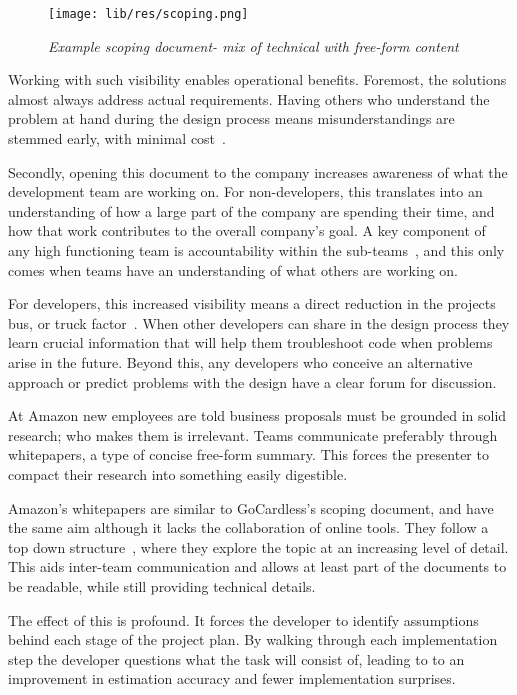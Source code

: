 \documentclass[11pt]{article}
\begin{document}
\begin{figure}
\centering
\texttt{[image: lib/res/scoping.png]}
\caption{\label{fig:scoping}\textit{Example scoping document- mix of technical with
free-form content}}
\end{figure}

Working with such visibility enables operational benefits. Foremost, the
solutions almost always address actual requirements. Having others who
understand the problem at hand during the design process means misunderstandings
are stemmed early, with minimal cost~\cite{costOfChangeEssay}.

Secondly, opening this document to the company increases awareness of what the
development team are working on. For non-developers, this translates into an
understanding of how a large part of the company are spending their time, and
how that work contributes to the overall company's goal. A key component of any
high functioning team is accountability within the
sub-teams~\cite{fiveDysfunctions}, and this only comes when teams have an
understanding of what others are working on.

For developers, this increased visibility means a direct reduction in the
projects bus, or truck factor~\cite{truckFactor}. When other developers can
share in the design process they learn crucial information that will help them
troubleshoot code when problems arise in the future. Beyond this, any developers
who conceive an alternative approach or predict problems with the design have a
clear forum for discussion.

At Amazon new employees are told business proposals must be grounded in solid
research; who makes them is irrelevant. Teams communicate preferably through
whitepapers, a type of concise free-form summary. This forces the presenter to
compact their research into something easily digestible.

Amazon's whitepapers are similar to GoCardless's scoping document, and have the
same aim although it lacks the collaboration of online tools. They follow a top
down structure~\cite{reportingAndWriting}, where they explore the topic at an
increasing level of detail. This aids inter-team communication and allows at
least part of the documents to be readable, while still providing technical
details.

The effect of this is profound. It forces the developer to identify assumptions
behind each stage of the project plan. By walking through each implementation
step the developer questions what the task will consist of, leading to to an
improvement in estimation accuracy and fewer implementation surprises.
\end{document}
